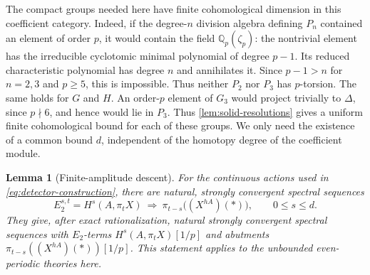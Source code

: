 \documentclass[11pt]{article}
\numberwithin{equation}{section}
\newtheorem{lemma}[theorem]{Lemma}
\theoremstyle{definition}
\theoremstyle{remark}
\newcommand{\Q}{\mathbb Q}
\begin{document}
The compact groups needed here have finite cohomological dimension in
this coefficient category.  Indeed, if the degree-$n$ division algebra
defining $P_n$ contained an element of order $p$, it would contain the
field $\Q_p(\zeta_p)$: the nontrivial element has the irreducible
cyclotomic minimal polynomial of degree $p-1$.  Its reduced
characteristic polynomial has degree $n$ and annihilates it.
Since $p-1>n$ for $n=2,3$ and $p\geq5$, this is impossible.
Thus neither $P_2$ nor $P_3$ has $p$-torsion.  The same holds for
$G$ and $H$.  An order-$p$ element of $G_3$ would project trivially to
$\Delta$, since $p\nmid6$, and hence would lie in $P_3$.  Thus
\cref{lem:solid-resolutions} gives a uniform finite cohomological bound
for each of these groups.  We only need the existence of a common bound
$d$, independent of the homotopy degree of the coefficient module.

\begin{lemma}[Finite-amplitude descent]\label{lem:descent-convergence}
For the continuous actions used in \eqref{eq:detector-construction},
there are natural, strongly convergent spectral sequences
\begin{equation}\label{eq:integral-descent-ss}
 E_2^{s,t}=H^s(A,\pi_tX)
       \ \Longrightarrow\ \pi_{t-s}\bigl((X^{hA})(*)\bigr),
 \qquad 0\leq s\leq d.
\end{equation}
They give, after exact rationalization, natural strongly convergent
spectral sequences with $E_2$-terms $H^s(A,\pi_tX)[1/p]$ and abutments
$\pi_{t-s}((X^{hA})(*))[1/p]$.
This statement applies to the unbounded even-periodic theories here.
\end{lemma}
\end{document}

